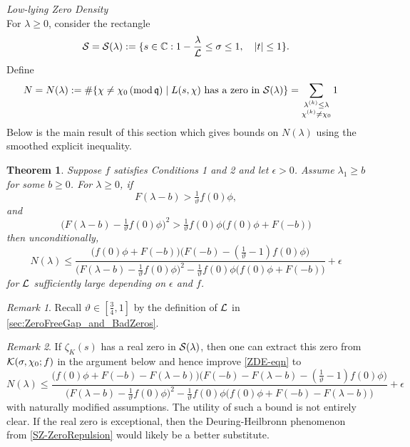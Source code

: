 \documentclass[12pt,psamsfonts]{amsart}
\newtheorem{thm}{Theorem}[section]
\theoremstyle{definition}
\theoremstyle{remark}
\newtheorem*{rem*}{Remark}
\numberwithin{equation}{section}
\begin{document}
\noindent
\emph{Low-lying Zero Density} \\
	For $\lambda \geq 0$, consider the rectangle
	\[
	\mathcal{S} = \mathcal{S}(\lambda) := \{ s \in \mathbb{C} : 1- \frac{\lambda}{\mathcal{L}} \leq \sigma \leq 1, \quad |t| \leq 1\}. 
	\]
	Define 
	\begin{align*}
	N = N(\lambda) & := \# \{ \chi \neq \chi_0 \, (\mathrm{mod} {\, \mathfrak{q}}) \mid L(s,\chi) \text{ has a zero in }\mathcal{S}(\lambda) \} =  \sum_{\substack{ \lambda^{(k)} \leq \lambda \\ \chi^{(k)} \neq \chi_0} } 1
	\end{align*}
	Below is the main result of this section which gives bounds on $N(\lambda)$ using the smoothed explicit inequality.

\begin{thm} \label{NewZDE}Suppose $f$ satisfies Conditions 1 and 2 and let $\epsilon > 0$.  Assume $\lambda_1 \geq b$ for some $b \geq 0$.  For $\lambda \geq 0$,  if
\[
F(\lambda-b) > \tfrac{1}{\vartheta} f(0)\phi,
\]
and
\[
\Big( F(\lambda-b) - \tfrac{1}{\vartheta}f(0)\phi \Big)^2 > \tfrac{1}{\vartheta} f(0)\phi \Big(f(0)\phi + F(-b)\Big)
\]
then unconditionally, 
\begin{equation}
N(\lambda)\leq 
\frac{\Big( f(0)\phi + F(-b) \Big)\Big( F(-b) - (\tfrac{1}{\vartheta}-1)f(0)\phi \Big)}
{\Big( F(\lambda-b) - \tfrac{1}{\vartheta}f(0)\phi \Big)^2 -\tfrac{1}{\vartheta} f(0)\phi \Big(f(0)\phi + F(-b) \Big)} + \epsilon
\label{ZDE-eqn}
\end{equation}
for $\mathcal{L}$ sufficiently large depending on $\epsilon$ and $f$. 
\end{thm}
%
\begin{rem*} Recall $\vartheta \in [\tfrac{3}{4}, 1]$ by the definition of $\mathcal{L}$ in \cref{sec:ZeroFreeGap_and_BadZeros}. 
\end{rem*}
\begin{rem*} If $\zeta_K(s)$ has a real zero in $\mathcal{S}(\lambda)$, then one can extract this zero from $\mathcal{K}(\sigma, \chi_0; f)$ in the argument below and hence improve \eqref{ZDE-eqn} to 
\[
N(\lambda)\leq 
\frac{\Big( f(0)\phi + F(-b) - F(\lambda-b)\Big)\Big( F(-b)- F(\lambda-b) - (\tfrac{1}{\vartheta}-1)f(0)\phi \Big)}
{\Big( F(\lambda-b) - \tfrac{1}{\vartheta}f(0)\phi \Big)^2 -\tfrac{1}{\vartheta} f(0)\phi \Big(f(0)\phi + F(-b) - F(\lambda-b)\Big)} + \epsilon
\]
with naturally modified assumptions. The utility of such a bound is not entirely clear. If the real zero is exceptional, then the Deuring-Heilbronn  phenomenon from \cref{SZ-ZeroRepulsion} would likely be a better substitute. 
\end{rem*}
\end{document}
